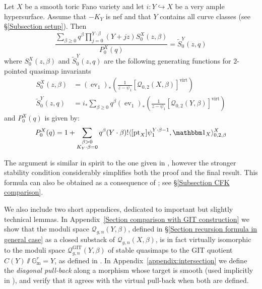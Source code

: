 \documentclass[11pt]{amsart}
\newcommand{\Q}[4]{\mathcal{Q}_{#1,#2}(#3,#4)}
\newcommand{\Gm}{\mathbb{G}_{\text{m}}}
\newcommand{\virt}[1]{[#1]^{\operatorname{virt}}}
\newcommand{\pt}{\operatorname{pt}}
\newcommand{\ev}{\operatorname{ev}}
\newcommand{\om}[1]{\mathcal{#1}}
\theoremstyle{definition}
\newenvironment{customthm}[1]
  {\renewcommand\theinnercustomthm{#1}\innercustomthm}
  {\endinnercustomthm}
\theoremstyle{definition}
\begin{document}
\begin{customthm}{\ref{Theorem Quantum Lefschetz}}
Let $X$ be a smooth toric Fano variety and let $i\colon Y \hookrightarrow X$ be a very ample hypersurface. Assume that $-K_Y$ is nef and that $Y$ contains all curve classes (see \S \ref{Subsection setup}). Then
\begin{equation*}
\dfrac{\sum_{\beta\geq 0} q^\beta\prod_{j=0}^{Y\cdot\beta}(Y+jz)S_0^X(z,\beta)}{P_0^X(q)}= \tilde{S}_0^Y(z,q)
\end{equation*}
where $S_0^X(z,\beta)$ and $\tilde{S}_0^Y(z,q)$ are the following generating functions for $2$-pointed quasimap invariants
\begin{align*}
S_0^X(z,\beta)&=(\ev_1)_*\left(\frac{1}{z-\psi_1} \virt{\Q{0}{2}{X}{\beta}}\right) \\
\tilde{S}_0^Y(z,q)&=i_* \sum_{\beta \geq 0} q^\beta (\ev_1)_*\left(\frac{1}{z-\psi_1} \virt{\Q{0}{2}{Y}{\beta}}\right)
\end{align*}
and $P_0^X(q)$ is given by:
\begin{equation*}
P_0^X(q) = 1 + \sum_{\substack{\beta>0 \\ K_Y\cdot\beta=0}} q^\beta(Y\cdot\beta)!\langle [\pt_X] \psi_1^{Y\cdot\beta-1} ,\mathbbm 1_{X}\rangle_{0,2,\beta}^X
\end{equation*}
\end{customthm}

The argument is similar in spirit to the one given in \cite{Ga-MF}, however the stronger stability condition considerably simplifies both the proof and the final result. This formula can also be obtained as a consequence of \cite[Corollary~5.5.1]{CF-K-wallcrossing}; see \S \ref{Subsection CFK comparison}. 

We also include two short appendices, dedicated to important but slightly technical lemmas. In Appendix~\ref{Section comparison with GIT construction} we show that the moduli space $\Q{g}{n}{Y}{\beta}$, defined in \S \ref{Section recursion formula in general case} as a closed substack of $\Q{g}{n}{X}{\beta}$, is in fact virtually isomorphic to the moduli space $\om{Q}^{\operatorname{GIT}}_{g,n}(Y,\beta)$ of stable quasimaps to the GIT quotient $C(Y)\sslash \Gm^r=Y$, as defined in \cite{CFKM}. In Appendix~\ref{appendix:intersection} we define the \emph{diagonal pull-back} along a morphism whose target is smooth (used implicitly in \cite{Ga}), and verify that it agrees with the virtual pull-back \cite{Manolache-Pull} when both are defined.
\end{document}
